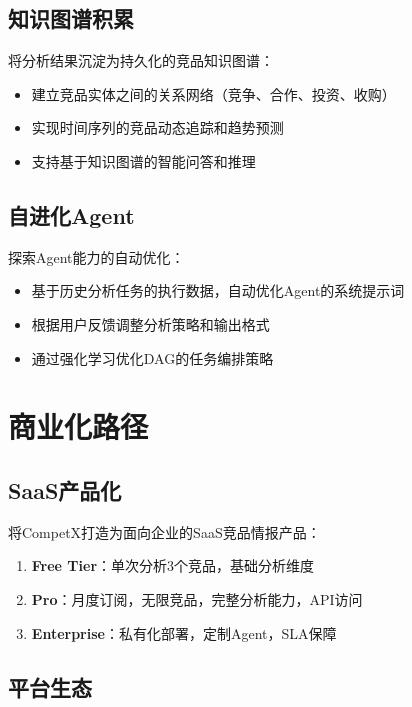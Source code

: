\documentclass[12pt,a4paper]{ctexrep}
\begin{document}
\subsection{知识图谱积累}

将分析结果沉淀为持久化的竞品知识图谱：

\begin{itemize}[leftmargin=2em]
\item 建立竞品实体之间的关系网络（竞争、合作、投资、收购）
\item 实现时间序列的竞品动态追踪和趋势预测
\item 支持基于知识图谱的智能问答和推理
\end{itemize}

\subsection{自进化Agent}

探索Agent能力的自动优化：

\begin{itemize}[leftmargin=2em]
\item 基于历史分析任务的执行数据，自动优化Agent的系统提示词
\item 根据用户反馈调整分析策略和输出格式
\item 通过强化学习优化DAG的任务编排策略
\end{itemize}

\section{商业化路径}

\subsection{SaaS产品化}

将CompetX打造为面向企业的SaaS竞品情报产品：

\begin{enumerate}[leftmargin=2em]
\item \textbf{Free Tier}：单次分析3个竞品，基础分析维度
\item \textbf{Pro}：月度订阅，无限竞品，完整分析能力，API访问
\item \textbf{Enterprise}：私有化部署，定制Agent，SLA保障
\end{enumerate}

\subsection{平台生态}
\end{document}
